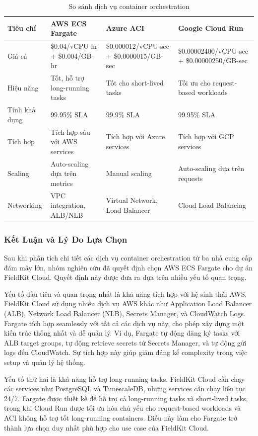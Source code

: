 \begin{table}[H]
\centering
\caption{So sánh dịch vụ container orchestration}
\label{tab:so-sanh-compute}
\begin{tabular}{|p{2.5cm}|p{3.5cm}|p{3.5cm}|p{3.5cm}|}
\hline
\textbf{Tiêu chí} & \textbf{AWS ECS Fargate} & \textbf{Azure ACI} & \textbf{Google Cloud Run} \\
\hline
Giá cả & \$0.04/vCPU-hr + \$0.004/GB-hr & \$0.000012/vCPU-sec + \$0.0000015/GB-sec & \$0.00002400/vCPU-sec + \$0.00000250/GB-sec \\
\hline
Hiệu năng & Tốt, hỗ trợ long-running tasks & Tốt cho short-lived tasks & Tối ưu cho request-based workloads \\
\hline
Tính khả dụng & 99.95\% SLA & 99.9\% SLA & 99.95\% SLA \\
\hline
Tích hợp & Tích hợp sâu với AWS services & Tích hợp với Azure services & Tích hợp với GCP services \\
\hline
Scaling & Auto-scaling dựa trên metrics & Manual scaling & Auto-scaling dựa trên requests \\
\hline
Networking & VPC integration, ALB/NLB & Virtual Network, Load Balancer & Cloud Load Balancing \\
\hline
\end{tabular}
\end{table}

\subsubsection{Kết Luận và Lý Do Lựa Chọn}

Sau khi phân tích chi tiết các dịch vụ container orchestration từ ba nhà cung cấp đám mây lớn, nhóm nghiên cứu đã quyết định chọn AWS ECS Fargate cho dự án FieldKit Cloud. Quyết định này được đưa ra dựa trên nhiều yếu tố quan trọng.

Yếu tố đầu tiên và quan trọng nhất là khả năng tích hợp với hệ sinh thái AWS. FieldKit Cloud sử dụng nhiều dịch vụ AWS khác như Application Load Balancer (ALB), Network Load Balancer (NLB), Secrets Manager, và CloudWatch Logs. Fargate tích hợp seamlessly với tất cả các dịch vụ này, cho phép xây dựng một kiến trúc thống nhất và dễ quản lý. Ví dụ, Fargate tự động đăng ký tasks với ALB target groups, tự động retrieve secrets từ Secrets Manager, và tự động gửi logs đến CloudWatch. Sự tích hợp này giúp giảm đáng kể complexity trong việc setup và quản lý hệ thống.

Yếu tố thứ hai là khả năng hỗ trợ long-running tasks. FieldKit Cloud cần chạy các services như PostgreSQL và TimescaleDB, những services cần chạy liên tục 24/7. Fargate được thiết kế để hỗ trợ cả long-running tasks và short-lived tasks, trong khi Cloud Run được tối ưu hóa chủ yếu cho request-based workloads và ACI không hỗ trợ tốt long-running containers. Điều này làm cho Fargate trở thành lựa chọn duy nhất phù hợp cho use case của FieldKit Cloud.

